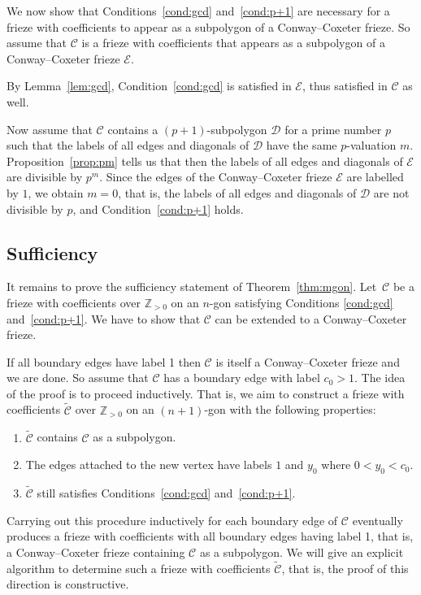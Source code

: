 \documentclass[10pt]{amsart}
\numberwithin{equation}{section}
\theoremstyle{definition}
\theoremstyle{remark}
\begin{document}
We now show that Conditions~\eqref{cond:gcd} and~\eqref{cond:p+1} are necessary for a frieze with
coefficients to appear as a subpolygon of a Conway--Coxeter frieze.
So assume that $\mathcal{C}$ is a frieze with coefficients that appears as a subpolygon of a Conway--Coxeter frieze $\mathcal{E}$.

By Lemma~\ref{lem:gcd}, Condition~\eqref{cond:gcd} is satisfied in $\mathcal{E}$, thus satisfied in $\mathcal{C}$ as well.

Now assume that $\mathcal{C}$ contains a $(p+1)$-subpolygon $\mathcal{D}$ for a prime number $p$
such that the labels of all edges and diagonals of $\mathcal{D}$ have the same $p$-valuation $m$.
Proposition~\ref{prop:pm} tells us that then the labels of all edges and
diagonals of $\mathcal{E}$ are divisible by $p^m$. Since the edges of the
Conway--Coxeter frieze $\mathcal{E}$ are labelled by $1$, we obtain $m=0$,
that is, the labels of all edges and diagonals of $\mathcal{D}$ are
not divisible by $p$, and Condition~\eqref{cond:p+1} holds.

\subsection{Sufficiency}

It remains to prove the sufficiency statement of Theorem~\ref{thm:mgon}. Let~$\mathcal{C}$ be a frieze with coefficients over $\mathbb{Z}_{>0}$ on an 
$n$-gon satisfying Conditions \eqref{cond:gcd} and~\eqref{cond:p+1}. We have to show
that $\mathcal{C}$ can be extended to a Conway--Coxeter frieze. 

If all boundary edges have label 1 then $\mathcal{C}$ is itself a Conway--Coxeter
frieze and we are done. So assume that $\mathcal{C}$ has a boundary edge with
label $c_0>1$. 
The idea of the proof is to proceed inductively. That is, we aim to construct
a frieze with coefficients $\widetilde{\mathcal{C}}$ over $\mathbb{Z}_{>0}$ 
on an $(n+1)$-gon with the following properties:
\begin{enumerate}[label=(\roman*)]
 \item %
 $\widetilde{\mathcal{C}}$
 contains $\mathcal{C}$ as a subpolygon. 
 \item %
 The edges attached to the new vertex have labels $1$ and $y_0$ where 
 $0< y_0 < c_0$.
 \item %
 $\widetilde{\mathcal{C}}$ still satisfies Conditions~\eqref{cond:gcd} and~\eqref{cond:p+1}.
\end{enumerate} 
Carrying out this procedure inductively for each boundary edge of $\mathcal{C}$
eventually produces 
a frieze with coefficients with all boundary edges having label 1, that is, a 
Conway--Coxeter frieze containing $\mathcal{C}$ as a subpolygon. We will give an
explicit algorithm to determine such a frieze with coefficients $\widetilde{\mathcal{C}}$,
that is, the proof of this direction is constructive. 
\end{document}
